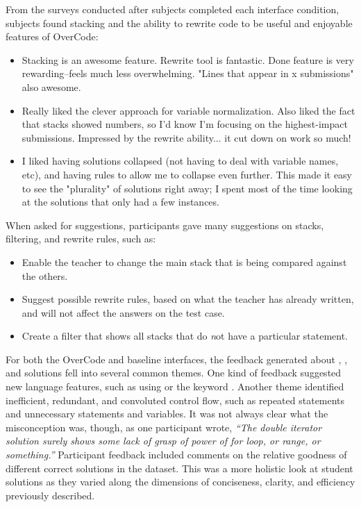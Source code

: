 From the surveys conducted after subjects completed each interface condition, subjects found stacking and the ability to rewrite code to be useful and enjoyable features of OverCode:
\begin{itemize}
\item Stacking is an awesome feature. Rewrite tool is fantastic. Done feature is very rewarding--feels much less overwhelming. "Lines that appear in x submissions" also awesome.

\item Really liked the clever approach for variable normalization. Also liked the fact that stacks showed numbers, so I'd know I'm focusing on the highest-impact submissions. Impressed by the rewrite ability... it cut down on work so much!

\item I liked having solutions collapsed (not having to deal with variable names, etc), and having rules to allow me to collapse even further. This made it easy to see the "plurality" of solutions right away; I spent most of the time looking at the solutions that only had a few instances.
\end{itemize}

When asked for suggestions, participants gave many suggestions on stacks, filtering, and rewrite rules, such as:
\begin{itemize}

\item Enable the teacher to change the main stack that is being compared against the others.
\item Suggest possible rewrite rules, based on what the teacher has already written, and will not affect the answers on the test case.
\item Create a filter that shows all stacks that do {\emph not} have a particular statement.
\end{itemize}

For both the OverCode and baseline interfaces, the feedback generated about , , and  solutions fell into several common themes. One kind of feedback suggested new language features, such as using \codevar{*=} or the keyword . Another theme identified inefficient, redundant, and convoluted control flow, such as repeated statements and unnecessary statements and variables. It was not always clear what the misconception was, though, as one participant wrote, \textit{``The double iterator solution surely shows some lack of grasp of power of for loop, or range, or something.''} Participant feedback included comments on the relative goodness of different correct solutions in the dataset. This was a more holistic look at student solutions as they varied along the dimensions of conciseness, clarity, and efficiency previously described.

